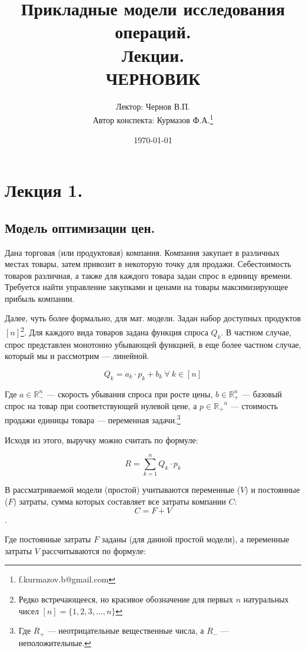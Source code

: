 \documentclass[reqno]{article}
\title{Прикладные модели исследования операций.\\ Лекции.\\ ЧЕРНОВИК}
\author{Лектор: Чернов В.П.\\ Автор конспекта: Курмазов Ф.А.\thanks{f.kurmazov.b@gmail.com}}
\date{\today}
\theoremstyle{definition}
\theoremstyle{definition}
\theoremstyle{definition}
\theoremstyle{definition}
\theoremstyle{definition}
\theoremstyle{definition}
\theoremstyle{definition}
\theoremstyle{definition}
\theoremstyle{definition}
\begin{document}
	\setlength{\parindent}{0pt}

	\maketitle

	\tableofcontents




	\newpage
	\section{Лекция 1.}
		\subsection{Модель оптимизации цен.}
			
			Дана торговая (или продуктовая) компания. Компания закупает в различных местах товары, затем привозит в некоторую точку для продажи. Себестоимость товаров различная, а также для каждого товара задан спрос в единицу времени. Требуется найти управление закупками и ценами на товары максимизирующее прибыль компании.\medskip
			
			Далее, чуть более формально, для мат. модели. Задан набор доступных продуктов $[n]$\footnote{Редко встречающееся, но красивое обозначение для первых $n$ натуральных чисел $[n] = \{1, 2, 3, ..., n\}$}. Для каждого вида товаров задана функция спроса $Q_k$. В частном случае, спрос представлен монотонно убывающей функцией, в еще более частном случае, который мы и рассмотрим --- линейной.

			$$Q_k = a_k\cdot p_k + b_k\ \forall\ k \in [n]$$

			Где $a \in \mathds{R}^n_-$ --- скорость убывания спроса при росте цены, $b \in \mathds{R}^n_+$ --- базовый спрос на товар при соответствующей нулевой цене, а  $p \in \mathds{R_+}^n$ --- стоимость продажи единицы товара --- переменная задачи.\footnote{Где $R_+$ --- неотрицательные вещественные числа, а $R_-$ --- неположительные.}
			
			Исходя из этого, выручку можно считать по формуле:

			$$R = \sum^n_{k=1} Q_k\cdot p_k$$	
			
			В рассматриваемой модели (простой) учитываются переменные ($V$) и постоянные ($F$) затраты, сумма которых составляет все затраты компании $C$:
			$$C = F + V$$.

			Где постоянные затраты $F$ заданы (для данной простой модели), а переменные затраты $V$ рассчитываются по формуле:
\end{document}
